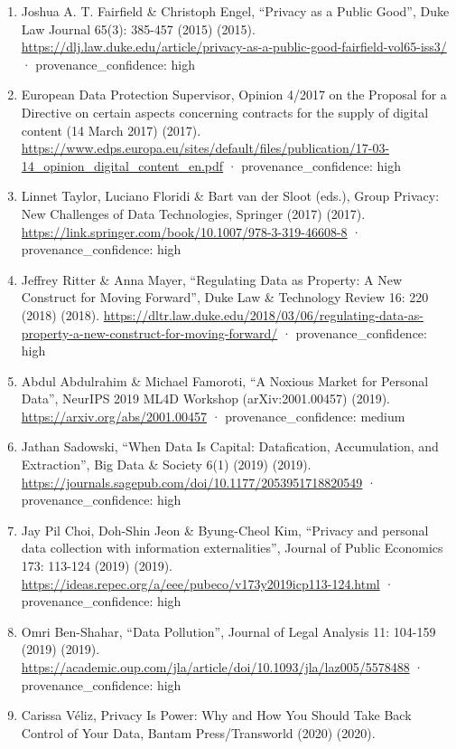 \documentclass[
  11pt,
]{article}
\begin{document}
\begin{enumerate}
  · provenance\_confidence: high
\item
  Joshua A. T. Fairfield \& Christoph Engel, ``Privacy as a Public
  Good'', Duke Law Journal 65(3): 385-457 (2015) (2015).
  \url{https://dlj.law.duke.edu/article/privacy-as-a-public-good-fairfield-vol65-iss3/}
  · provenance\_confidence: high
\item
  European Data Protection Supervisor, Opinion 4/2017 on the Proposal
  for a Directive on certain aspects concerning contracts for the supply
  of digital content (14 March 2017) (2017).
  \url{https://www.edps.europa.eu/sites/default/files/publication/17-03-14_opinion_digital_content_en.pdf}
  · provenance\_confidence: high
\item
  Linnet Taylor, Luciano Floridi \& Bart van der Sloot (eds.), Group
  Privacy: New Challenges of Data Technologies, Springer (2017) (2017).
  \url{https://link.springer.com/book/10.1007/978-3-319-46608-8} ·
  provenance\_confidence: high
\item
  Jeffrey Ritter \& Anna Mayer, ``Regulating Data as Property: A New
  Construct for Moving Forward'', Duke Law \& Technology Review 16: 220
  (2018) (2018).
  \url{https://dltr.law.duke.edu/2018/03/06/regulating-data-as-property-a-new-construct-for-moving-forward/}
  · provenance\_confidence: high
\item
  Abdul Abdulrahim \& Michael Famoroti, ``A Noxious Market for Personal
  Data'', NeurIPS 2019 ML4D Workshop (arXiv:2001.00457) (2019).
  \url{https://arxiv.org/abs/2001.00457} · provenance\_confidence:
  medium
\item
  Jathan Sadowski, ``When Data Is Capital: Datafication, Accumulation,
  and Extraction'', Big Data \& Society 6(1) (2019) (2019).
  \url{https://journals.sagepub.com/doi/10.1177/2053951718820549} ·
  provenance\_confidence: high
\item
  Jay Pil Choi, Doh-Shin Jeon \& Byung-Cheol Kim, ``Privacy and personal
  data collection with information externalities'', Journal of Public
  Economics 173: 113-124 (2019) (2019).
  \url{https://ideas.repec.org/a/eee/pubeco/v173y2019icp113-124.html} ·
  provenance\_confidence: high
\item
  Omri Ben-Shahar, ``Data Pollution'', Journal of Legal Analysis 11:
  104-159 (2019) (2019).
  \url{https://academic.oup.com/jla/article/doi/10.1093/jla/laz005/5578488}
  · provenance\_confidence: high
\item
  Carissa Véliz, Privacy Is Power: Why and How You Should Take Back
  Control of Your Data, Bantam Press/Transworld (2020) (2020).

\end{enumerate}
\end{document}
